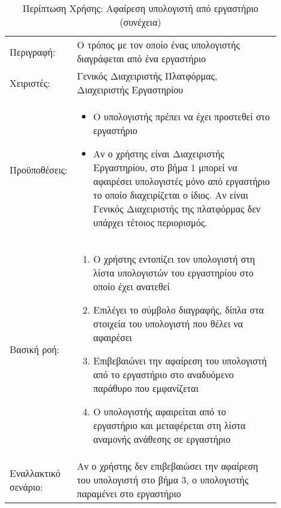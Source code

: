 %
%
\begin{longtable}{|p{0.14\linewidth}|p{0.76\linewidth}|}
	\caption{Περίπτωση Χρήσης: Αφαίρεση υπολογιστή από εργαστήριο} \label{tab:use-case-delete-computer-from-lab} \\ \hline \endfirsthead
	\caption[{}]{Περίπτωση Χρήσης: Αφαίρεση υπολογιστή από εργαστήριο (συνέχεια)} \\ \endhead \endfoot
	Περιγραφή: & Ο τρόπος με τον οποίο ένας υπολογιστής διαγράφεται από ένα εργαστήριο \\ \hline
	Χειριστές: & Γενικός Διαχειριστής Πλατφόρμας, Διαχειριστής Εργαστηρίου \\ \hline
	Προϋποθέσεις: &
	\begin{itemize}
		\vspace{-1cm}
		\addtolength{\itemindent}{-0.4cm}
		\item Ο υπολογιστής πρέπει να έχει προστεθεί στο εργαστήριο
		\item Αν ο χρήστης είναι Διαχειριστής Εργαστηρίου, στο βήμα 1 μπορεί να αφαιρέσει υπολογιστές μόνο από εργαστήριο το οποίο διαχειρίζεται ο ίδιος. Αν είναι Γενικός Διαχειριστής της πλατφόρμας δεν υπάρχει τέτοιος περιορισμός.
		\vspace{-0.7cm}
	\end{itemize} \\ \hline
	Βασική ροή: &
	\begin{enumerate}
		\vspace{-1cm}
		\addtolength{\itemindent}{-0.4cm}
		\item Ο χρήστης εντοπίζει τον υπολογιστή στη λίστα υπολογιστών του εργαστηρίου στο οποίο έχει ανατεθεί
		\item Επιλέγει το σύμβολο διαγραφής, δίπλα στα στοιχεία του υπολογιστή που θέλει να αφαιρέσει
		\item Επιβεβαιώνει την αφαίρεση του υπολογιστή από το εργαστήριο στο αναδυόμενο παράθυρο που εμφανίζεται
		\item Ο υπολογιστής αφαιρείται από το εργαστήριο και μεταφέρεται στη λίστα αναμονής ανάθεσης σε εργαστήριο
		\vspace{-0.7cm}
	\end{enumerate} \\ \hline
	Εναλλακτικό σενάριο: & Αν ο χρήστης δεν επιβεβαιώσει την αφαίρεση του υπολογιστή στο βήμα 3, ο υπολογιστής παραμένει στο εργαστήριο \\ \hline
\end{longtable}

